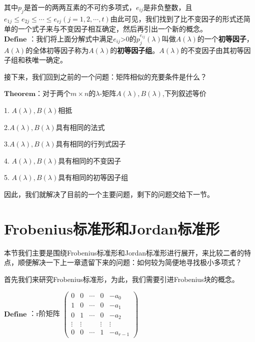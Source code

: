 \documentclass[a4paper,12pt]{book}
\begin{document}
其中$\mathit{p}_{j}$是首一的两两互素的不可约多项式，$\mathit{e_{ij}}$是非负整数，且$\mathit{e_{1j}} \le \mathit{e_{2j}} \le \cdots \le \mathit{e_{rj}}(j=1,2,\cdots,t)$由此可见，我们找到了比不变因子的形式还简单的一个式子来与不变因子相互确定，然后再引出一个新的概念。~\\

$\mathbf{Define}$ ：我们将上面分解式中满足$\mathit{e_{ij}}$>0的$p_{j}^{e_{ij}}(\lambda)$叫做$\mathit{A}(\lambda)$的一个\textbf{初等因子}，$\mathit{A}(\lambda)$的全体初等因子称为$\mathit{A}(\lambda)$的\textbf{初等因子组}。$\mathit{A}(\lambda)$的不变因子由其初等因子组和秩唯一确定。

接下来，我们回到之前的一个问题：矩阵相似的充要条件是什么？

$\mathbf{Theorem}$：对于两个$m\times n$的$\lambda$-矩阵$\mathit{A(\lambda),B(\lambda)}$,下列叙述等价

1. $\mathit{A(\lambda),B(\lambda)}$相抵

2.$\mathit{A(\lambda),B(\lambda)}$具有相同的法式

3.$\mathit{A(\lambda),B(\lambda)}$具有相同的行列式因子

4. $\mathit{A(\lambda),B(\lambda)}$具有相同的不变因子

5. $\mathit{A(\lambda),B(\lambda)}$具有相同的初等因子组

因此，我们就解决了目前的一个主要问题，剩下的问题交给下一节。~\\




\section{Frobenius标准形和Jordan标准形}

本节我们主要是围绕Frobenius标准形和Jordan标准形进行展开，来比较二者的特点，顺便解决一下上一章遗留下来的问题：如何较为简便地寻找极小多项式？

首先我们来研究Frobenius标准形，为此，我们需要引进Frobenius块的概念。

$\mathbf{Define}$ ：r阶矩阵
$
\begin{pmatrix}
	0& 0 & \cdots   &0  & -a_{0} \\
	1& 0 & \cdots  & 0 & -a_{1} \\
	0& 1 &\cdots   & 0 &-a_{2}  \\
	\vdots & \vdots &   &  \vdots& \vdots\\
	0& 0 & \cdots & 1 &-a_{r-1} 
\end{pmatrix}$
\end{document}
